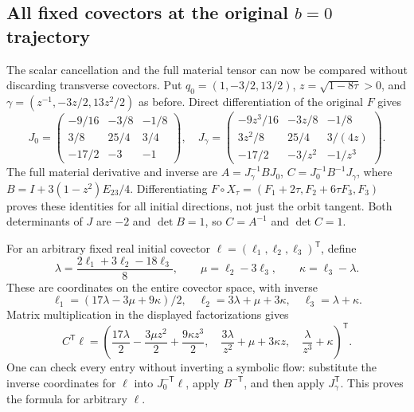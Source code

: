 \subsection{All fixed covectors at the original $b=0$ trajectory}

The scalar cancellation and the full material tensor can now be
compared without discarding transverse covectors. Put
$q_0=(1,-3/2,13/2)$, $z=\sqrt{1-8\tau}>0$, and
$\gamma=(z^{-1},-3z/2,13z^2/2)$ as before. Direct differentiation of
the original $F$ gives
\[
 J_0=\begin{pmatrix}-9/16&-3/8&-1/8\\3/8&25/4&3/4\\-17/2&-3&-1\end{pmatrix},
 \quad
 J_\gamma=\begin{pmatrix}-9z^3/16&-3z/8&-1/8\\3z^2/8&25/4&3/(4z)\\-17/2&-3/z^2&-1/z^3\end{pmatrix}.
\]
The full material derivative and inverse are
$A=J_\gamma^{-1}BJ_0$, $C=J_0^{-1}B^{-1}J_\gamma$,
where $B=I+3(1-z^2)E_{23}/4$. Differentiating
$F\circ X_\tau=(F_1+2\tau,F_2+6\tau F_3,F_3)$ proves these
identities for all initial directions, not just the orbit tangent.
Both determinants of $J$ are $-2$ and $\det B=1$, so $C=A^{-1}$
and $\det C=1$.

For an arbitrary fixed real initial covector
$\ell=(\ell_1,\ell_2,\ell_3)^{\mathsf T}$, define
\[
 \lambda=\frac{2\ell_1+3\ell_2-18\ell_3}{8},\qquad
 \mu=\ell_2-3\ell_3,\qquad \kappa=\ell_3-\lambda.
\]
These are coordinates on the entire covector space, with inverse
\[
 \ell_1=(17\lambda-3\mu+9\kappa)/2,\quad
 \ell_2=3\lambda+\mu+3\kappa,\quad \ell_3=\lambda+\kappa.
\]
Matrix multiplication in the displayed factorizations gives
\begin{equation}
 C^{\mathsf T}\ell=
 \left(\frac{17\lambda}{2}-\frac{3\mu z^2}{2}
                         +\frac{9\kappa z^3}{2},\quad
       \frac{3\lambda}{z^2}+\mu+3\kappa z,\quad
       \frac{\lambda}{z^3}+\kappa\right)^{\mathsf T}.
 \label{eq:ej-all-covectors}
\end{equation}
One can check every entry without inverting a symbolic flow: substitute
the inverse coordinates for $\ell$ into $J_0^{-\mathsf T}\ell$,
apply $B^{-\mathsf T}$, and then apply $J_\gamma^{\mathsf T}$.
This proves the formula for arbitrary $\ell$.

